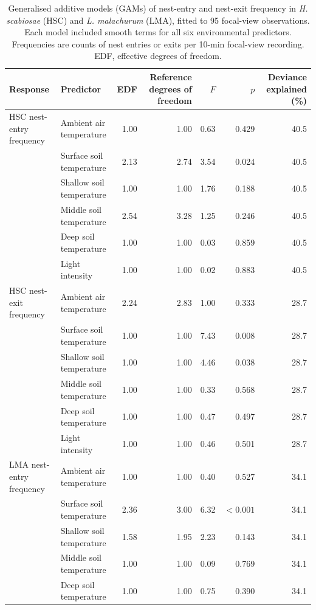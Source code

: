 \documentclass[11pt,a4paper]{article}
\begin{document}

\begin{table}[!htbp]
\centering
\begingroup
\fontsize{8.5}{10}\selectfont
\caption{Generalised additive models (GAMs) of nest-entry and nest-exit frequency in \textit{H. scabiosae} (HSC) and \textit{L. malachurum} (LMA), fitted to 95 focal-view observations. Each model included smooth terms for all six environmental predictors. Frequencies are counts of nest entries or exits per 10-min focal-view recording. EDF, effective degrees of freedom.}
\label{tab:gam_models}

\begin{tabular}{llrrrrr}
\toprule
Response & Predictor & EDF & Reference degrees of freedom & $F$ & $p$ & Deviance explained (\%) \\
\midrule
HSC nest-entry frequency & Ambient air temperature & 1.00 & 1.00 & 0.63 & 0.429 & 40.5 \\
 & Surface soil temperature & 2.13 & 2.74 & 3.54 & 0.024 & 40.5 \\
 & Shallow soil temperature & 1.00 & 1.00 & 1.76 & 0.188 & 40.5 \\
 & Middle soil temperature & 2.54 & 3.28 & 1.25 & 0.246 & 40.5 \\
 & Deep soil temperature & 1.00 & 1.00 & 0.03 & 0.859 & 40.5 \\
 & Light intensity & 1.00 & 1.00 & 0.02 & 0.883 & 40.5 \\
\midrule
HSC nest-exit frequency & Ambient air temperature & 2.24 & 2.83 & 1.00 & 0.333 & 28.7 \\
 & Surface soil temperature & 1.00 & 1.00 & 7.43 & 0.008 & 28.7 \\
 & Shallow soil temperature & 1.00 & 1.00 & 4.46 & 0.038 & 28.7 \\
 & Middle soil temperature & 1.00 & 1.00 & 0.33 & 0.568 & 28.7 \\
 & Deep soil temperature & 1.00 & 1.00 & 0.47 & 0.497 & 28.7 \\
 & Light intensity & 1.00 & 1.00 & 0.46 & 0.501 & 28.7 \\
\midrule
LMA nest-entry frequency & Ambient air temperature & 1.00 & 1.00 & 0.40 & 0.527 & 34.1 \\
 & Surface soil temperature & 2.36 & 3.00 & 6.32 & $<0.001$ & 34.1 \\
 & Shallow soil temperature & 1.58 & 1.95 & 2.23 & 0.143 & 34.1 \\
 & Middle soil temperature & 1.00 & 1.00 & 0.09 & 0.769 & 34.1 \\
 & Deep soil temperature & 1.00 & 1.00 & 0.75 & 0.390 & 34.1 \\

\end{tabular}
\end{table}
\end{document}

